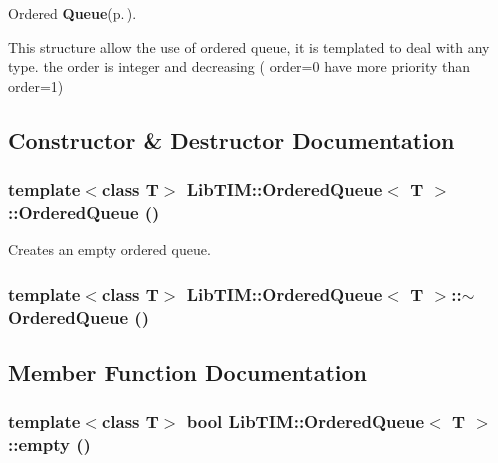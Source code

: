 Ordered {\bf Queue}{\rm (p.\,\pageref{classLibTIM_1_1Queue})}. 

This structure allow the use of ordered queue, it is templated to deal with any type. the order is integer and decreasing ( order=0 have more priority than order=1)



\subsection{Constructor \& Destructor Documentation}
\subsubsection{\setlength{\rightskip}{0pt plus 5cm}template$<$class T$>$ {\bf Lib\-TIM::Ordered\-Queue}$<$ T $>$::{\bf Ordered\-Queue} ()\hspace{0.3cm}{\tt  [inline]}}\label{classLibTIM_1_1OrderedQueue_a0}


Creates an empty ordered queue. 

\subsubsection{\setlength{\rightskip}{0pt plus 5cm}template$<$class T$>$ {\bf Lib\-TIM::Ordered\-Queue}$<$ T $>$::$\sim${\bf Ordered\-Queue} ()\hspace{0.3cm}{\tt  [inline]}}\label{classLibTIM_1_1OrderedQueue_a1}




\subsection{Member Function Documentation}
\subsubsection{\setlength{\rightskip}{0pt plus 5cm}template$<$class T$>$ bool {\bf Lib\-TIM::Ordered\-Queue}$<$ T $>$::empty ()\hspace{0.3cm}{\tt  [inline]}}\label{classLibTIM_1_1OrderedQueue_a4}


